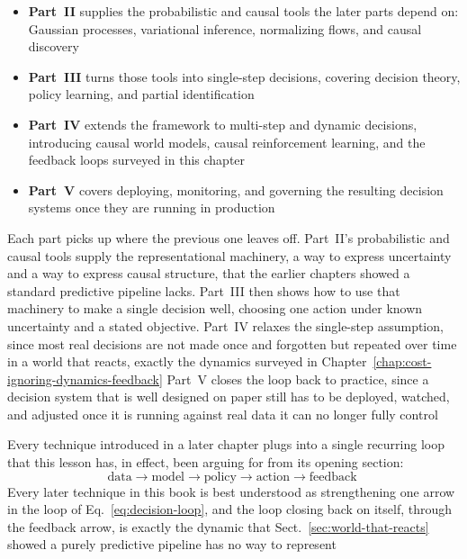 \begin{itemize}
  \item \textbf{Part~II} supplies the probabilistic and causal tools the later
    parts depend on: Gaussian processes, variational inference, normalizing flows,
    and causal discovery

  \item \textbf{Part~III} turns those tools into single-step decisions, covering
    decision theory, policy learning, and partial identification

  \item \textbf{Part~IV} extends the framework to multi-step and dynamic
    decisions, introducing causal world models, causal reinforcement learning, and
    the feedback loops surveyed in this chapter

  \item \textbf{Part~V} covers deploying, monitoring, and governing the
    resulting decision systems once they are running in production
\end{itemize}

Each part picks up where the previous one leaves off. Part~II's probabilistic and
causal tools supply the representational machinery, a way to express uncertainty
and a way to express causal structure, that the earlier chapters showed a standard
predictive pipeline lacks. Part~III then shows how to use that machinery to make
a single decision well, choosing one action under known uncertainty and a stated
objective. Part~IV relaxes the single-step assumption, since most real decisions
are not made once and forgotten but repeated over time in a world that reacts,
exactly the dynamics surveyed in Chapter~\ref{chap:cost-ignoring-dynamics-feedback}
Part~V closes the loop back to practice, since a decision system that is well designed
on paper still has to be deployed, watched, and adjusted once it is running against
real data it can no longer fully control

Every technique introduced in a later chapter plugs into a single recurring loop
that this lesson has, in effect, been arguing for from its opening section:
\begin{equation}
  \label{eq:decision-loop}\text{data}\to \text{model}\to \text{policy}\to \text{action}
  \to \text{feedback}\;
\end{equation}
Every later technique in this book is best understood as strengthening one arrow
in the loop of Eq.~\eqref{eq:decision-loop}, and the loop closing back on itself,
through the feedback arrow, is exactly the dynamic that Sect.~\ref{sec:world-that-reacts}
showed a purely predictive pipeline has no way to represent
